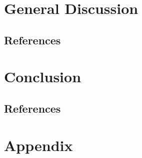 \documentclass[12pt,a4paper,twoside,openright]{book}
\begin{document}
\begin{sloppy}
\newpage
\thispagestyle{empty}
\chapter{General Discussion \label{ch:discussion}}

\clearpage \thispagestyle{empty}\mbox{}\clearpage
\begin{refsection}

\newpage
\section{References}
\printbibliography[heading=none]
\end{refsection}

\newpage
\chapter{Conclusion \label{ch:conclusion}}

\clearpage \thispagestyle{empty}\mbox{}\clearpage
\begin{conclusion}

\newpage
\section{References}
\printbibliography[heading=none]
\end{conclusion}

\newpage
\chapter{Appendix}






\end{sloppy}
\end{document}
